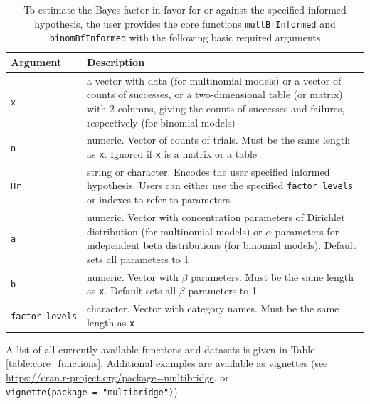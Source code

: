 \documentclass[
  english,
  man,floatsintext]{apa6}
\begin{document}
\begin{table}
\caption{To estimate the Bayes factor in favor for or against the specified informed hypothesis, the user provides the core functions \texttt{multBfInformed} and \texttt{binomBfInformed} with the following basic required arguments}
\label{tab:arguments}
\begin{center}
\begin{tabular}{p{4cm}p{12cm}}
        \toprule
Argument & Description \\\midrule
\texttt{x} & a vector with data (for multinomial models) or a vector of counts of successes, or a two-dimensional table (or matrix) with 2 columns, giving the counts of successes and failures, respectively (for binomial models)  \\
\texttt{n} &  numeric. Vector of counts of trials. Must be the same length as \texttt{x}. Ignored if \texttt{x} is a matrix or a table \\
\texttt{Hr} & string or character. Encodes the user specified informed hypothesis. Users can either use the specified \texttt{factor\_levels} or indexes to refer to parameters.\\
\texttt{a} & numeric. Vector with concentration parameters of Dirichlet distribution (for multinomial models) or $\alpha$ parameters for independent beta distributions (for binomial models). Default sets all parameters to 1 \\
\texttt{b} & numeric. Vector with $\beta$ parameters. Must be the same length as \texttt{x}. Default sets all $\beta$ parameters to 1 \\
\texttt{factor\_levels} &  character. Vector with category names. Must be the same length as \texttt{x}\\
\bottomrule
\end{tabular}
\end{center}
\end{table}

A list of all currently available functions and datasets is given in Table \ref{table:core_functions}. Additional examples are available as vignettes (see \url{https://cran.r-project.org/package=multibridge}, or \texttt{vignette(package\ =\ "multibridge")}).
\end{document}
